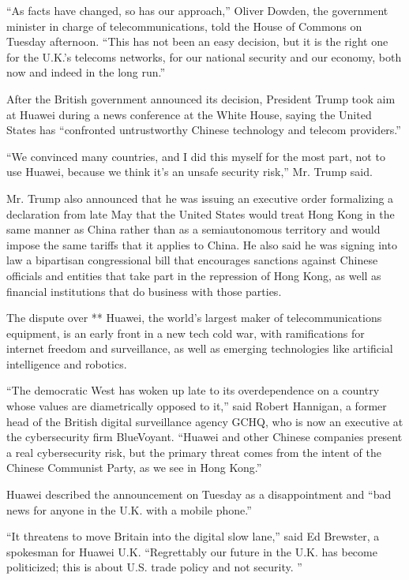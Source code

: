 ``As facts have changed, so has our approach,'' Oliver Dowden, the
government minister in charge of telecommunications, told the House of
Commons on Tuesday afternoon. ``This has not been an easy decision, but
it is the right one for the U.K.'s telecoms networks, for our national
security and our economy, both now and indeed in the long run.''

After the British government announced its decision, President Trump
took aim at Huawei during a news conference at the White House, saying
the United States has ``confronted untrustworthy Chinese technology and
telecom providers.''

``We convinced many countries, and I did this myself for the most part,
not to use Huawei, because we think it's an unsafe security risk,'' Mr.
Trump said.

Mr. Trump also announced that he was issuing an executive order
formalizing a declaration from late May that the United States would
treat Hong Kong in the same manner as China rather than as a
semiautonomous territory and would impose the same tariffs that it
applies to China. He also said he was signing into law a bipartisan
congressional bill that encourages sanctions against Chinese officials
and entities that take part in the repression of Hong Kong, as well as
financial institutions that do business with those parties.

The dispute over ** Huawei, the world's largest maker of
telecommunications equipment, is an early front in a new tech cold war,
with ramifications for internet freedom and surveillance, as well as
emerging technologies like artificial intelligence and robotics.

``The democratic West has woken up late to its overdependence on a
country whose values are diametrically opposed to it,'' said Robert
Hannigan, a former head of the British digital surveillance agency GCHQ,
who is now an executive at the cybersecurity firm BlueVoyant. ``Huawei
and other Chinese companies present a real cybersecurity risk, but the
primary threat comes from the intent of the Chinese Communist Party, as
we see in Hong Kong.''

Huawei described the announcement on Tuesday as a disappointment and
``bad news for anyone in the U.K. with a mobile phone.''

``It threatens to move Britain into the digital slow lane,'' said Ed
Brewster, a spokesman for Huawei U.K. ``Regrettably our future in the
U.K. has become politicized; this is about U.S. trade policy and not
security. ''

